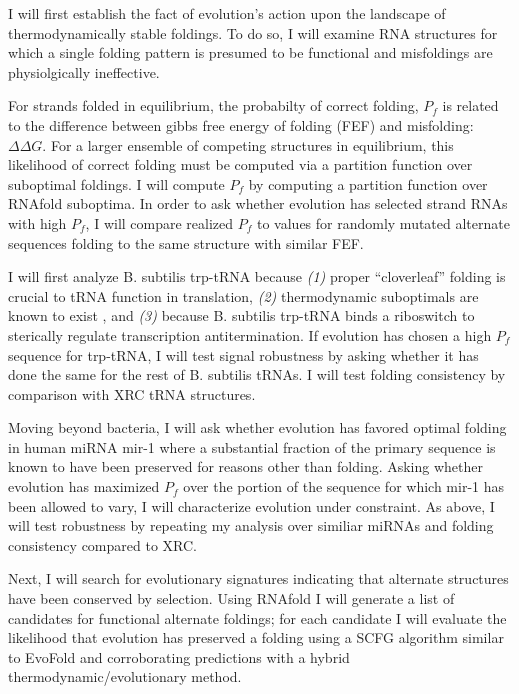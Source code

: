 

I will first establish the fact of evolution's action upon the landscape of thermodynamically stable foldings. To do so, I will examine RNA structures for which a single folding pattern is presumed to be functional and misfoldings are physiolgically ineffective.

For strands folded in equilibrium, the probabilty of correct folding, $P_f$ is related to the difference between gibbs free energy of folding (FEF) and misfolding: $\Delta\Delta G$. For a larger ensemble of competing structures in equilibrium, this likelihood of correct folding must be computed via a partition function over suboptimal foldings. I will compute $P_f$ by computing a partition function over RNAfold suboptima. In order to ask whether evolution has selected strand RNAs with high $P_f$, I will compare realized $P_f$ to values for randomly mutated alternate sequences folding to the same structure with similar FEF.

I will first analyze B. subtilis trp-tRNA because \textit{(1)} proper ``cloverleaf'' folding is crucial to tRNA function in translation, \textit{(2)} thermodynamic suboptimals are known to exist \cite{RefWorks:18}, and \textit{(3)} because B. subtilis trp-tRNA binds a riboswitch to sterically regulate transcription antitermination\cite{RefWorks:20}. If evolution has chosen a high $P_f$ sequence for trp-tRNA, I will test signal robustness by asking whether it has done the same for the rest of B. subtilis tRNAs. I will test folding consistency by comparison with XRC tRNA structures. 

Moving beyond bacteria, I will ask whether evolution has favored optimal folding in human miRNA mir-1  where a substantial fraction of the primary sequence is known to have been preserved for reasons other than folding. Asking whether evolution has maximized $P_f$ over the portion of the sequence for which mir-1 has been allowed to vary, I will characterize evolution under constraint. As above, I will test robustness by repeating my analysis over similiar miRNAs and folding consistency compared to XRC.

Next, I will search for evolutionary signatures indicating that alternate structures have been conserved by selection. Using RNAfold I will generate a list of candidates for functional alternate foldings; for each candidate I will evaluate the likelihood that evolution has preserved a folding using a SCFG algorithm similar to EvoFold \cite{RefWorks:21} and corroborating predictions  with a hybrid thermodynamic/evolutionary method\cite{RefWorks:16}.

